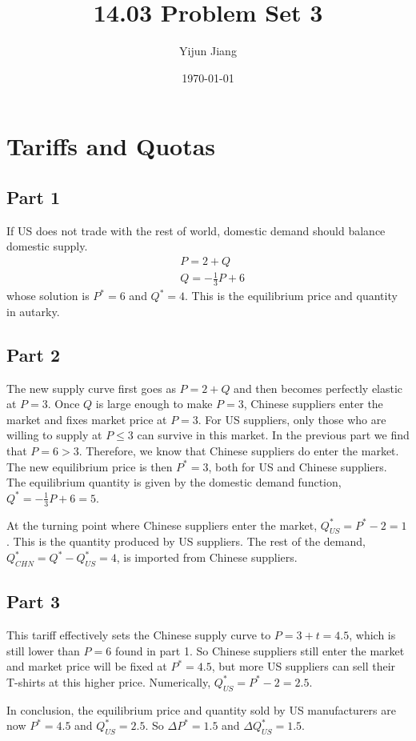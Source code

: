\documentclass{article}
\title{14.03 Problem Set 3}
\author{Yijun Jiang}
\date{\today}
\begin{document}
\maketitle

\section{Tariffs and Quotas}
\subsection{Part 1}
If US does not trade with the rest of world, domestic demand should balance domestic supply.
\begin{align*}
	&P=2+Q\\
	&Q=-\frac{1}{3}P+6
\end{align*}
whose solution is $P^*=6$ and $Q^*=4$. This is the equilibrium price and quantity in autarky.

\subsection{Part 2}
The new supply curve first goes as $P=2+Q$ and then becomes perfectly elastic at $P=3$. Once $Q$ is large enough to make $P=3$, Chinese suppliers enter the market and fixes market price at $P=3$. For US suppliers, only those who are willing to supply at $P\leqslant3$ can survive in this market. In the previous part we find that $P=6>3$. Therefore, we know that Chinese suppliers do enter the market. The new equilibrium price is then $P^*=3$, both for US and Chinese suppliers. The equilibrium quantity is given by the domestic demand function, $Q^*=-\frac{1}{3}P+6=5$.

At the turning point where Chinese suppliers enter the market, $Q^*_{US}=P^*-2=1$. This is the quantity produced by US suppliers. The rest of the demand, $Q^*_{CHN}=Q^*-Q^*_{US}=4$, is imported from Chinese suppliers.

\subsection{Part 3}
This tariff effectively sets the Chinese supply curve to $P=3+t=4.5$, which is still lower than $P=6$ found in part 1. So Chinese suppliers still enter the market and market price will be fixed at $P^*=4.5$, but more US suppliers can sell their T-shirts at this higher price. Numerically, $Q^*_{US}=P^*-2=2.5$.

In conclusion, the equilibrium price and quantity sold by US manufacturers are now $P^*=4.5$ and $Q^*_{US}=2.5$. So $\Delta P^*=1.5$ and $\Delta Q^*_{US}=1.5$.
\end{document}
